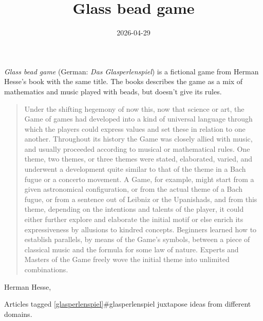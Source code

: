 \documentclass{note}
\title{Glass bead game}
\date{2026-04-29}
\begin{document}
\emph{Glass bead game} (German: \emph{Das Glasperlenspiel}) is a fictional game from Herman Hesse's book with the same title.
The books describes the game as a mix of mathematics and music played with beads, but doesn't give its rules.

\blockquote{
  Under the shifting hegemony of now this, now that science or art,
  the Game of games had developed into a kind of universal language through which the players could express values and set these in relation to one another.
  Throughout its history the Game was closely allied with music,
  and usually proceeded according to musical or mathematical rules.
  One theme, two themes, or three themes were stated, elaborated, varied, and underwent a development quite similar to that of the theme in a Bach fugue or a concerto movement.
  A Game, for example, might start from a given astronomical configuration, or from the actual theme of a Bach fugue, or from a sentence out of Leibniz or the Upanishads,
  and from this theme, depending on the intentions and talents of the player,
  it could either further explore and elaborate the initial motif or else enrich its expressiveness by allusions to kindred concepts.
  Beginners learned how to establish parallels, by means of the Game's symbols, between a piece of classical music and the formula for some law of nature.
  Experts and Masters of the Game freely wove the initial theme into unlimited combinations.
}{Herman Hesse, \cite{The Glass Bead Game}}

Articles tagged \ref{glasperlenspiel}{#glasperlenspiel} juxtapose ideas from different domains.
\end{document}

